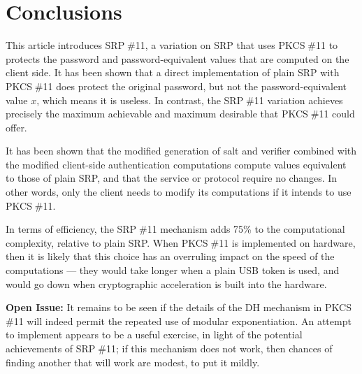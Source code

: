 \documentclass[a4paper,11pt]{article}
\def\pkcs11{PKCS$\;$\#11\xspace}
\def\srp11{SRP$\;$\#11\xspace}
\begin{document}
\section{Conclusions}

This article introduces \srp11, a variation on SRP that uses \pkcs11 to protects the password and password-equivalent values that are computed on the client side.  It has been shown that a direct implementation of plain SRP with \pkcs11 does protect the original password, but not the password-equivalent value $x$, which means it is useless.  In contrast, the \srp11 variation achieves precisely the maximum achievable and maximum desirable that \pkcs11 could offer.

It has been shown that the modified generation of salt and verifier combined with the modified client-side authentication computations compute values equivalent to those of plain SRP, and that the service or protocol require no changes.  In other words, only the client needs to modify its computations if it intends to use \pkcs11.

In terms of efficiency, the \srp11 mechanism adds 75\% to the computational complexity, relative to plain SRP.  When \pkcs11 is implemented on hardware, then it is likely that this choice has an overruling impact on the speed of the computations --- they would take longer when a plain USB token is used, and would go down when cryptographic acceleration is built into the hardware.

\textbf{Open Issue:} It remains to be seen if the details of the DH mechanism in \pkcs11 will indeed permit the repeated use of modular exponentiation.  An attempt to implement appears to be a useful exercise, in light of the potential achievements of \srp11; if this mechanism does not work, then chances of finding another that will work are modest, to put it mildly.
\end{document}
